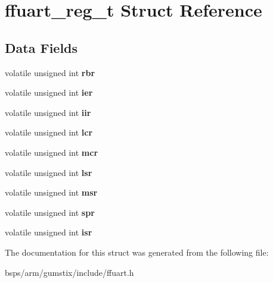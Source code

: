 \hypertarget{structffuart__reg__t}{}\section{ffuart\+\_\+reg\+\_\+t Struct Reference}
\label{structffuart__reg__t}
\subsection*{Data Fields}
\begin{DoxyCompactItemize}
\item 
\mbox{\label{structffuart__reg__t_aa740e6c610d388d75aa370e2862d4a69}} 
volatile unsigned int {\bfseries rbr}
\item 
\mbox{\label{structffuart__reg__t_a8163d834f962178fb78766fea0c8bab4}} 
volatile unsigned int {\bfseries ier}
\item 
\mbox{\label{structffuart__reg__t_aa3e6ad4052392bc588a4d2752ee5bfb6}} 
volatile unsigned int {\bfseries iir}
\item 
\mbox{\label{structffuart__reg__t_a53316d44aca88679cfe22bdc4336da11}} 
volatile unsigned int {\bfseries lcr}
\item 
\mbox{\label{structffuart__reg__t_a135d1834449ffab01dee69f06bd9821c}} 
volatile unsigned int {\bfseries mcr}
\item 
\mbox{\label{structffuart__reg__t_ac31ae7532ab2cc9e4bf2e09088c9b123}} 
volatile unsigned int {\bfseries lsr}
\item 
\mbox{\label{structffuart__reg__t_a3509fa15f7c525a39e08231bc7c97c69}} 
volatile unsigned int {\bfseries msr}
\item 
\mbox{\label{structffuart__reg__t_afa3c3093b6b8c6e195d7e9f1e12f40a0}} 
volatile unsigned int {\bfseries spr}
\item 
\mbox{\label{structffuart__reg__t_ae6e90a9a50e92cfc1acf69d3b62dfa8c}} 
volatile unsigned int {\bfseries isr}
\end{DoxyCompactItemize}


The documentation for this struct was generated from the following file\+:\begin{DoxyCompactItemize}
\item 
bsps/arm/gumstix/include/ffuart.\+h\end{DoxyCompactItemize}
